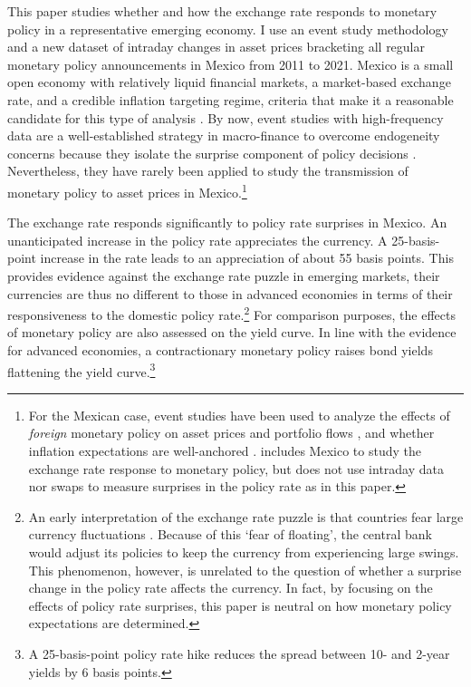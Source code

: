 This paper studies whether and how the exchange rate responds to monetary policy in a representative emerging economy. I use an event study methodology and a new dataset of intraday changes in asset prices bracketing all regular monetary policy announcements in Mexico from 2011 to 2021. 
Mexico is a small open economy with relatively liquid financial markets, a market-based exchange rate, and a credible inflation targeting regime, criteria that make it a reasonable candidate for this type of analysis \parencite{KearnsManners:2006,PenningsRamayandiTang:2015}. By now, event studies with high-frequency data are a well-established strategy in macro-finance to overcome endogeneity concerns because they isolate the surprise component of policy decisions \parencite{GurkaynakWright:2013,NakamuraSteinsson:2018JEP}. Nevertheless, they have rarely been applied to study the transmission of monetary policy to asset prices in Mexico.\footnote{ For the Mexican case, event studies have been used to analyze the effects of \textit{foreign} monetary policy on asset prices \parencite{BZP:2001,Rosa:2011Eco,HausmanWongswan:2011,KearnsSchrimpfXia:2018} and portfolio flows \parencite{HernandezVega:2021}, and whether inflation expectations are well-anchored \parencite{DePooter_etal:2014}. \textcite{Kohlscheen:2014} includes Mexico to study the exchange rate response to monetary policy, but does not use intraday data nor swaps to measure surprises in the policy rate as in this paper.} 

The exchange rate responds significantly to policy rate surprises in Mexico. An unanticipated increase in the policy rate appreciates the currency. A 25-basis-point increase in the rate leads to an appreciation of about 55 basis points. This provides evidence against the exchange rate puzzle in emerging markets, their currencies are thus no different to those in advanced economies in terms of their responsiveness to the domestic policy rate.\footnote{An early interpretation of the exchange rate puzzle is that countries fear large currency fluctuations \parencite{CalvoReinhart:2002}. Because of this `fear of floating', the central bank would adjust its policies to keep the currency from experiencing large swings. This phenomenon, however, is unrelated to the question of whether a surprise change in the policy rate affects the currency. In fact, by focusing on the effects of policy rate surprises, this paper is neutral on how monetary policy expectations are determined.} For comparison purposes, the effects of monetary policy are also assessed on the yield curve. In line with the evidence for advanced economies, a contractionary monetary policy raises bond yields flattening the yield curve.\footnote{A 25-basis-point policy rate hike reduces the spread between 10- and 2-year yields by 6 basis points.} 

